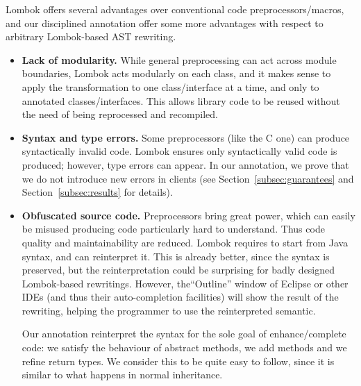 \noindent
Lombok offers several advantages over conventional code preprocessors/macros,
and our disciplined \mixin annotation offer some more advantages with respect to arbitrary Lombok-based
AST rewriting.
\begin{itemize}
\item \textbf{Lack of modularity.}
While general preprocessing can act across module boundaries, Lombok acts modularly on each class, and it makes
sense to apply the transformation to one class/interface at a time, and only to annotated classes/interfaces.
This allows library code to be reused without the need of being
reprocessed and recompiled.

\item \textbf{Syntax and type errors.}
Some preprocessors (like the C one) can produce syntactically invalid code.
Lombok ensures only syntactically valid code is produced; however, type errors can appear.
In our annotation, we prove that we do not introduce new errors in clients (see Section~\ref{subsec:guarantees} and Section~\ref{subsec:results} for details).

\item \textbf{Obfuscated source code.}
Preprocessors bring great power, which can easily be misused producing
code particularly hard to understand. Thus code quality and maintainability are reduced.
Lombok requires to start from Java syntax, and can reinterpret it.
This is already better, since the syntax is preserved, but the reinterpretation could be surprising for
badly designed Lombok-based rewritings.
However, the``Outline'' window of Eclipse or other IDEs (and thus their auto-completion facilities)
will show the result of the rewriting, helping the programmer to use the reinterpreted semantic.

Our annotation reinterpret the syntax for the sole goal of enhance/complete code:
we satisfy the behaviour of abstract methods, we add methods and we refine return types.
We consider this to be quite easy to follow, since it is similar to what happens in normal inheritance.


\end{itemize}
